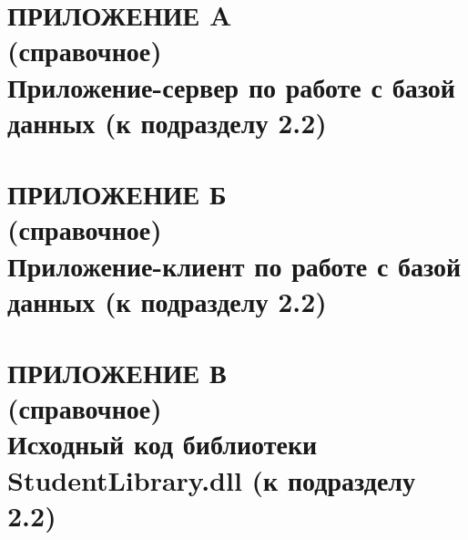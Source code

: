 \renewcommand{\thefigure}{\Asbuk{section}.\arabic{figure}}
\renewcommand{\thetable}{\Asbuk{section}.\arabic{table}}
\renewcommand{\thelstlisting}{\Asbuk{section}.\arabic{lstlisting}}

\pagestyle{fancy}
\fancyhf{}  %
\fancyfoot[R]{\thepage}
\renewcommand{\headrulewidth}{0pt}
\renewcommand{\footrulewidth}{0pt}

\setlength{\headheight}{10mm}
\setlength{\headsep}{\baselineskip}

\section*{ПРИЛОЖЕНИЕ A \\ (справочное) \\ Приложение-сервер по работе с базой данных (к подразделу 2.2)}

\thispagestyle{plain}
\setcounter{section}{1}
\setcounter{figure}{0}
\setcounter{table}{0}
\setcounter{lstlisting}{0}



\section*{ПРИЛОЖЕНИЕ Б \\ (справочное) \\ Приложение-клиент по работе с базой данных (к подразделу 2.2)}

\thispagestyle{plain}
\setcounter{section}{2}
\setcounter{figure}{0}
\setcounter{table}{0}
\setcounter{lstlisting}{0}



\section*{ПРИЛОЖЕНИЕ В \\ (справочное) \\ Исходный код библиотеки StudentLibrary.dll (к подразделу 2.2)}

\thispagestyle{plain}
\setcounter{section}{3}
\setcounter{figure}{0}
\setcounter{table}{0}
\setcounter{lstlisting}{0}

